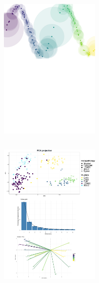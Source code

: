 \documentclass[compress]{beamer}
\begin{document}
\begin{frame}
\begin{overprint}
\begin{columns}[c]
  \begin{column}{0.5\linewidth}
   \begin{figure}
\centering
\includegraphics[height=7cm]{figures/methods/how_umap_works_local_metric_open_cover.pdf}
  \end{figure}
  \end{column}
 \end{columns} 
  
 
  
\begin{columns}[c]
  \begin{column}{0.5\linewidth}
  \begin{figure}
\centering
\includegraphics[height=7cm]{figures/methods/pca-methods2.pdf}
  \end{figure}
  \end{column}


\end{columns}
\end{overprint}
\end{frame}
\end{document}
